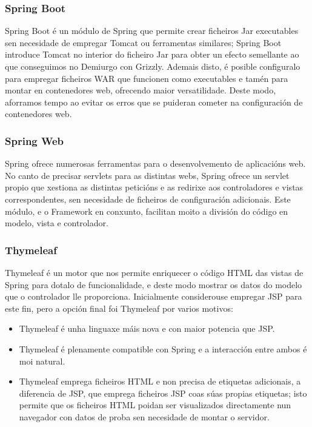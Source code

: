 \subsubsection{Spring Boot}
Spring Boot é un módulo de Spring que permite crear ficheiros Jar executables
sen necesidade de empregar Tomcat ou ferramentas similares; Spring Boot
introduce Tomcat no interior do ficheiro Jar para obter un efecto semellante ao
que conseguimos no Demiurgo con Grizzly. Ademais disto, é posible configuralo
para empregar ficheiros WAR que funcionen como executables e tamén para montar
en contenedores web, ofrecendo maior versatilidade. Deste modo, aforramos tempo
ao evitar os erros que se puideran cometer na configuración de contenedores web.

\subsubsection{Spring Web}
Spring ofrece numerosas ferramentas para o desenvolvemento de aplicacións web.
No canto de precisar servlets para as distintas webs, Spring ofrece un servlet
propio que xestiona as distintas peticións e as redirixe aos controladores e
vistas correspondentes, sen necesidade de ficheiros de configuración adicionais.
Este módulo, e o Framework en conxunto, facilitan moito a división do código en
modelo, vista e controlador.

\subsubsection{Thymeleaf}
Thymeleaf é un motor que nos permite enriquecer o código HTML das vistas de
Spring para dotalo de funcionalidade, e deste modo mostrar os datos do modelo
que o controlador lle proporciona. Inicialmente considerouse empregar JSP para
este fin, pero a opción final foi Thymeleaf por varios motivos:
\begin{itemize}
  \item Thymeleaf é unha linguaxe máis nova e con maior potencia que JSP.
  \item Thymeleaf é plenamente compatible con Spring e a interacción entre ambos
  é moi natural.
  \item Thymeleaf emprega ficheiros HTML e non precisa de etiquetas adicionais,
  a diferencia de JSP, que emprega ficheiros JSP coas súas propias etiquetas;
  isto permite que os ficheiros HTML poidan ser visualizados directamente nun
  navegador con datos de proba sen necesidade de montar o servidor.
\end{itemize}

